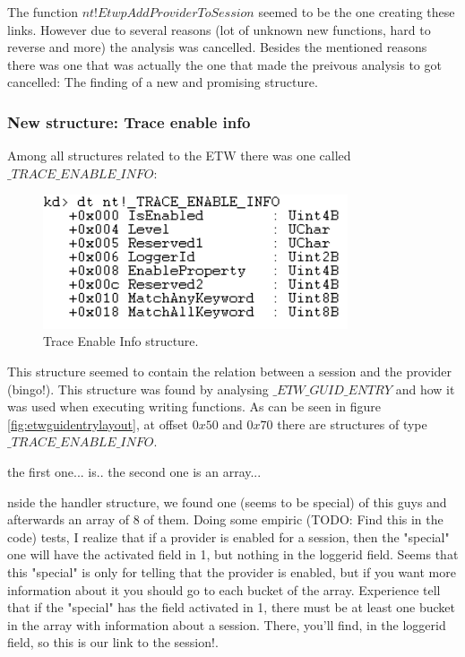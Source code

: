 The function $nt!EtwpAddProviderToSession$ seemed to be the one creating these links. However due to several reasons (lot of unknown new functions, hard to reverse and more) the analysis was cancelled. Besides the mentioned reasons there was one that was actually the one that made the preivous analysis to got cancelled: The finding of a new and promising structure. 

\subsubsection{\bfseries New structure: Trace enable info}

Among all structures related to the ETW there was one called $\_TRACE\_ENABLE\_INFO$:

\begin{centering}
  \begin{figure}[H]
    \includegraphics[width=9cm]{images/trace_enable_info.png}
    \caption[]{Trace Enable Info structure.}
    \label{fig:trace_enable_info}
  \end{figure}
\end{centering}

This structure seemed to contain the relation between a session and the provider (bingo!). This structure was found by analysing $\_ETW\_GUID\_ENTRY$ and how it was used when executing writing functions. As can be seen in figure \ref{fig:etwguidentrylayout}, at offset $0x50$ and $0x70$ there are structures of type $\_TRACE\_ENABLE\_INFO$.


the first one... is.. 
the second one is an array... 


nside the handler structure, we found one (seems to be special) of this guys and afterwards an array of 8 of them. Doing some empiric (TODO: Find this in the code) tests, I realize that if a provider is enabled for a session, then the "special" one will have the activated field in 1, but nothing in the loggerid field. Seems that this "special" is only for telling that the provider is enabled, but if you want more information about it you should go to each bucket of the array. Experience tell that if the "special" has the field activated in 1, there must be at least one bucket in the array with information about a session. There, you'll find, in the loggerid field, so this is our link to the session!.

